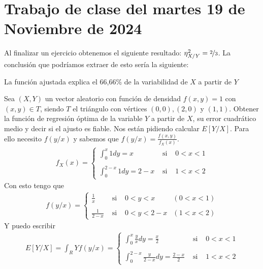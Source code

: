 \section{Trabajo de clase del martes 19 de Noviembre de 2024}

\begin{ejercicio}
    Al finalizar un ejercicio obtenemos el siguiente resultado: $\eta_{X/Y}^2= \nicefrac{2}{3}$.
    La conclusión que podríamos extraer de esto sería la siguiente:

    La función ajustada explica el 66,66\% de la variabilidad de $X$ a partir de $Y$
\end{ejercicio}

\begin{ejercicio}
    Sea $(X,Y)$ un vector aleatorio con función de densidad $f(x,y)=1$ con $(x,y)\in T$, siendo $T$ el triángulo con vértices $(0,0),(2,0)$ y $(1,1)$. Obtener la función de regresión óptima de la variable $Y$ a partir de $X$, su error cuadrático medio y decir si el ajusto es fiable.
    \endsquare
    Nos están pidiendo calcular $E[Y/X]$. Para ello necesito $f(y/x)$ y sabemos que $f(y/x)=\frac{f(x,y)}{f_X(x)}$. 
    \begin{align*}
        f_X(x)=\left\{
        \begin{array}{lcl}
            \int_0^x 1 dy = x & \text{ si } & 0<x<1\\\\
            \int_0^{2-x} 1 dy = 2-x & \text{ si } & 1<x<2
        \end{array}
        \right.
    \end{align*}
    Con esto tengo que 
    \begin{align*}
        f(y/x)=\left\{
        \begin{array}{ccll}
            \frac{1}{x} & \text{ si } & 0<y<x &(0<x<1)\\\\
            \frac{1}{2-x} & \text{ si } & 0<y<2-x & (1<x<2)
        \end{array}
        \right.
    \end{align*}
    Y puedo escribir
    \begin{align*}
        E[Y/X]= \int_R Y f(y/x) = \left\{
        \begin{array}{ccll}
            \int_0^x \frac{y}{x} dy = \frac{x}{2} & \text{ si } & 0<x<1\\\\
            \int_0^{2-x} \frac{y}{2-x} dy = \frac{2-x}{2} & \text{ si } &  1<x<2
        \end{array}

\end{align*}
\end{ejercicio}
